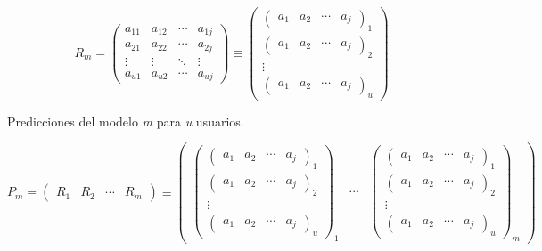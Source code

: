 \[  \textit{R$_{m}$} = 
    \begin{pmatrix}
        a_{11}  &  a_{12}  &  \cdots   & a_{1j} \\ 
        a_{21}  &  a_{22}  &  \cdots   & a_{2j}\\ 
        \vdots  &  \vdots  &  \ddots & \vdots  \\ 
        a_{u1}  &  a_{u2}  &  \cdots   & a_{uj}
    \end{pmatrix}
    \equiv
    \begin{pmatrix}
        \begin{pmatrix} a_{1}  &  a_{2}  &  \cdots   & a_{j} \end{pmatrix}_{1} \\ 
        \begin{pmatrix} a_{1}  &  a_{2}  &  \cdots   & a_{j} \end{pmatrix}_{2} \\ 
        \vdots \\ 
        \begin{pmatrix} a_{1}  &  a_{2}  &  \cdots   & a_{j} \end{pmatrix}_{u}
    \end{pmatrix}
\]
\begin{center}
    Predicciones del modelo \textit{m} para \textit{u} usuarios.
\end{center}
\pagebreak
\[  
    \textit{P$_{m}$}=
    \begin{pmatrix}
        \textit{R$_{1}$} & \textit{R$_{2}$} & \cdots & \textit{R$_{m}$}
    \end{pmatrix}
    \equiv
    \begin{pmatrix}
        \begin{pmatrix}
            \begin{pmatrix} a_{1}  &  a_{2}  &  \cdots   & a_{j} \end{pmatrix}_{1} \\ 
            \begin{pmatrix} a_{1}  &  a_{2}  &  \cdots   & a_{j} \end{pmatrix}_{2} \\ 
            \vdots \\ 
            \begin{pmatrix} a_{1}  &  a_{2}  &  \cdots   & a_{j} \end{pmatrix}_{u}
        \end{pmatrix}_{\textit{1}}
        & 
        \cdots 
        &
        \begin{pmatrix}
            \begin{pmatrix} a_{1}  &  a_{2}  &  \cdots   & a_{j} \end{pmatrix}_{1} \\ 
            \begin{pmatrix} a_{1}  &  a_{2}  &  \cdots   & a_{j} \end{pmatrix}_{2} \\ 
            \vdots \\ 
            \begin{pmatrix} a_{1}  &  a_{2}  &  \cdots   & a_{j} \end{pmatrix}_{u}
        \end{pmatrix}_{\textit{m}}
    \end{pmatrix}
\] 

